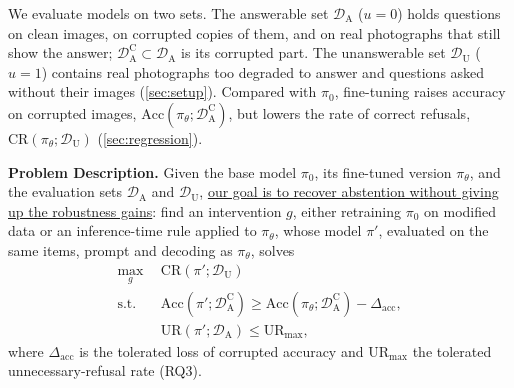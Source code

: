We evaluate models on two sets. The answerable set $\mathcal{D}_{\mathrm{A}}$ ($u = 0$) holds questions on clean images, on corrupted copies of them, and on real photographs that still show the answer; $\mathcal{D}_{\mathrm{A}}^{\mathrm{C}} \subset \mathcal{D}_{\mathrm{A}}$ is its corrupted part. The unanswerable set $\mathcal{D}_{\mathrm{U}}$ ($u = 1$) contains real photographs too degraded to answer and questions asked without their images (\cref{sec:setup}). Compared with $\pi_0$, fine-tuning raises accuracy on corrupted images, $\mathrm{Acc}(\pi_\theta;\mathcal{D}_{\mathrm{A}}^{\mathrm{C}})$, but lowers the rate of correct refusals, $\mathrm{CR}(\pi_\theta;\mathcal{D}_{\mathrm{U}})$ (\cref{sec:regression}).



\begin{tcolorbox}[enhanced, breakable, colback=probback, colframe=probframe, arc=2mm,
  boxrule=0.8pt, left=5pt, right=5pt, top=4pt, bottom=4pt]
\textbf{Problem Description.} Given the base model $\pi_0$, its fine-tuned version
$\pi_\theta$, and the evaluation sets $\mathcal{D}_{\mathrm{A}}$ and $\mathcal{D}_{\mathrm{U}}$, \uline{our goal is to recover abstention without giving up the robustness gains}: find an intervention $g$, either retraining $\pi_0$ on modified data or an inference-time rule applied to $\pi_\theta$, whose model $\pi'$, evaluated on the same items, prompt and
decoding as $\pi_\theta$, solves
\begin{equation}
\begin{aligned}
\max_{g}\ \ & \mathrm{CR}(\pi';\mathcal{D}_{\mathrm{U}}) \\
\text{s.t.}\ \ & \mathrm{Acc}(\pi';\mathcal{D}_{\mathrm{A}}^{\mathrm{C}}) \ge
  \mathrm{Acc}(\pi_\theta;\mathcal{D}_{\mathrm{A}}^{\mathrm{C}}) - \Delta_{\mathrm{acc}}, \\
& \mathrm{UR}(\pi';\mathcal{D}_{\mathrm{A}}) \le \mathrm{UR}_{\max},
\end{aligned}
\label{eq:recover}
\end{equation}
where $\Delta_{\mathrm{acc}}$ is the tolerated loss of corrupted accuracy and
$\mathrm{UR}_{\max}$ the tolerated unnecessary-refusal rate (RQ3).
\end{tcolorbox}


